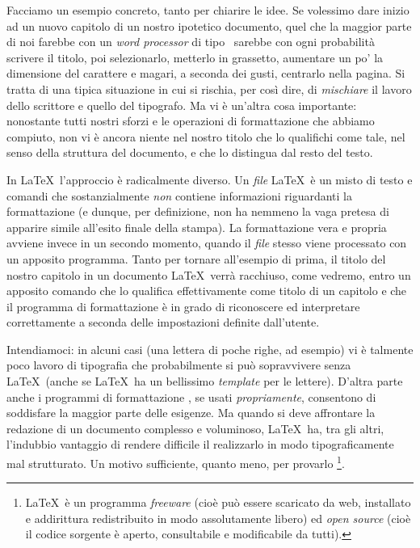 Facciamo un esempio concreto, tanto per chiarire le idee. Se volessimo dare
inizio ad un nuovo capitolo di un nostro ipotetico documento, quel che la
maggior parte di noi farebbe con un \emph{word processor} di tipo \wysiwyg\
sarebbe con ogni probabilit\`a scrivere il titolo, poi selezionarlo, metterlo
in grassetto, aumentare un po' la dimensione del carattere e magari, a seconda
dei gusti, centrarlo nella pagina. Si tratta di una tipica situazione in cui
si rischia, per cos\`i dire, di \emph{mischiare} il lavoro dello scrittore e
quello del tipografo. Ma vi \`e un'altra cosa importante: nonostante
tutti nostri sforzi e le operazioni di formattazione che abbiamo compiuto,
non vi \`e ancora niente nel nostro titolo che lo qualifichi come tale,
nel senso della struttura del documento, e che lo distingua dal resto del
testo.

In \LaTeX\ l'approccio \`e radicalmente diverso. Un \emph{file} \LaTeX\ \`e
un misto di testo e comandi che sostanzialmente \emph{non} contiene
informazioni riguardanti la formattazione (e dunque, per definizione, non ha
nemmeno la vaga pretesa di apparire simile all'esito finale della stampa).
La formattazione vera e propria avviene invece in un secondo momento, quando
il \emph{file} stesso viene processato con un apposito programma. Tanto per
tornare all'esempio di prima, il titolo del nostro capitolo in un documento
\LaTeX\ verr\`a racchiuso, come vedremo, entro un apposito comando che lo
qualifica effettivamente come titolo di un capitolo e che il programma di
formattazione \`e in grado di riconoscere ed interpretare correttamente a
seconda delle impostazioni definite dall'utente.

Intendiamoci: in alcuni casi (una lettera di poche righe, ad esempio) vi \`e
talmente poco lavoro di tipografia che probabilmente si pu\`o sopravvivere
senza \LaTeX\ (anche se \LaTeX\ ha un bellissimo \emph{template} per le
lettere). D'altra parte anche i programmi di formattazione \wysiwyg, se usati
\emph{propriamente}, consentono di soddisfare la maggior parte delle esigenze.
Ma quando si deve affrontare la redazione di un documento complesso e
voluminoso, \LaTeX\ ha, tra gli altri, l'indubbio vantaggio di
rendere difficile il realizzarlo in modo tipograficamente mal strutturato.
Un motivo sufficiente, quanto meno, per provarlo%
\footnote{
\LaTeX\ \`e un programma \emph{freeware} (cio\`e pu\`o essere scaricato da
web, installato e addirittura redistribuito in modo assolutamente
libero) ed \emph{open source} (cio\`e il codice sorgente \`e aperto,
consultabile e modificabile da tutti).}.


